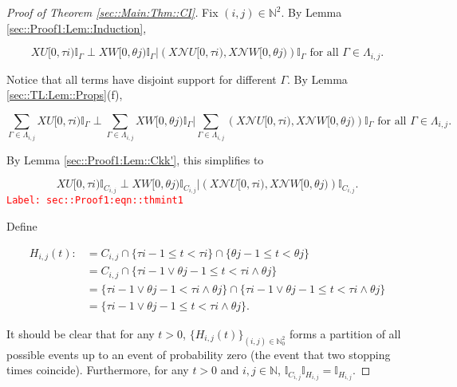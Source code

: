 \documentclass[12pt]{article}
\newcommand{\mb}{\mathbb}
\newcommand{\mc}{\mathcal}
\newcommand{\te}{\text}
\newcommand{\tr}{\textcolor{red}}
\newcommand{\labe}[1]{\tr{\texttt{Label: #1}}}
\renewcommand{\U}{U}							%
\newcommand{\UU}{W}								%
\renewcommand{\t}{t}							%
\newcommand{\X}{X}								%
\newcommand{\neigh}{\mc{N}}						%
\newcommand{\rt}{\tau}							%
\newcommand{\rtt}{\theta}						%
\newcommand{\apath}{\Gamma}						%
\newcommand{\pathset}[2]{\Lambda_{#1,#2}}		%
\newcommand{\pathsete}[2]{C_{#1,#2}}			%
\newcommand{\pathseted}[2]{H_{#1,#2}}			%
\begin{document}
\begin{proof}[Proof of Theorem \ref{sec::Main:Thm::CI}]

Fix \((i,j) \in \mb{N}^2\). By Lemma \ref{sec::Proof1:Lem::Induction}, 

\[\X{\U}{[0,\rt{i})}\mb{I}_{\apath{}}\perp \X{\UU}{[0,\rtt{j})}\mb{I}_{\apath{}}\big|\left(\X{\neigh{\U}}{[0,\rt{i})},\X{\neigh{\UU}}{[0,\rtt{j})}\right)\mb{I}_{\apath{}}\te{ for all }\apath{} \in \pathset{i}{j}.\]

Notice that all terms have disjoint support for different \(\apath{}\). By Lemma \ref{sec::TL:Lem::Props}(f), 

\[\sum_{\apath{}\in\pathset{i}{j}}\X{\U}{[0,\rt{i})}\mb{I}_{\apath{}}\perp \sum_{\apath{}\in\pathset{i}{j}}\X{\UU}{[0,\rtt{j})}\mb{I}_{\apath{}}\bigg|\sum_{\apath{}\in\pathset{i}{j}}\left(\X{\neigh{\U}}{[0,\rt{i})},\X{\neigh{\UU}}{[0,\rtt{j})}\right)\mb{I}_{\apath{}}\te{ for all }\apath{} \in \pathset{i}{j}.\]

By Lemma \ref{sec::Proof1:Lem::Ckk'}, this simplifies to 

\begin{equation}
\X{\U}{[0,\rt{i})}\mb{I}_{\pathsete{i}{j}}\perp \X{\UU}{[0,\rtt{j})}\mb{I}_{\pathsete{i}{j}}\big|\left(\X{\neigh{\U}}{[0,\rt{i})},\X{\neigh{\UU}}{[0,\rtt{j})}\right)\mb{I}_{\pathsete{i}{j}}.
\label{sec::Proof1:eqn::thmint1}
\end{equation}
\labe{sec::Proof1:eqn::thmint1}

Define

\begin{align*}
\pathseted{i}{j}(\t) :&= \pathsete{i}{j}\cap \{\rt{i-1}\leq \t < \rt{i}\}\cap \{\rtt{j-1} \leq \t < \rtt{j}\}\\
&=\pathsete{i}{j}\cap\{\rt{i-1}\vee\rtt{j-1} \leq \t < \rt{i}\wedge \rtt{j}\}\\
&=\{\rt{i-1}\vee\rtt{j-1}  < \rt{i}\wedge \rtt{j}\} \cap \{\rt{i-1}\vee\rtt{j-1} \leq \t < \rt{i}\wedge \rtt{j}\}\\
&= \{\rt{i-1}\vee\rtt{j-1} \leq \t < \rt{i}\wedge \rtt{j}\}.
\end{align*}

It should be clear that for any \(\t > 0\), \(\{\pathseted{i}{j}(\t)\}_{(i,j)\in\mb{N}_0^2}\) forms a partition of all possible events up to an event of probability zero (the event that two stopping times coincide). Furthermore, for any \(\t > 0\) and \(i,j\in \mb{N}\), \(\mb{I}_{\pathsete{i}{j}}\mb{I}_{\pathseted{i}{j}} = \mb{I}_{\pathseted{i}{j}}\).


\end{proof}
\end{document}
